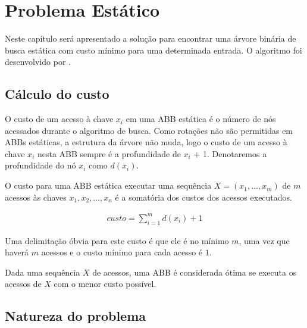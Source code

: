 
\chapter{Problema Estático}
\label{cap:problema-estatico}

Neste capítulo será apresentado a solução para encontrar uma árvore binária de busca estática com custo mínimo para uma determinada entrada. O algoritmo foi desenvolvido por \cite{knuth}.

\section{Cálculo do custo}

O custo de um acesso à chave $x_i$ em uma ABB estática é o número de nós acessados durante o algoritmo de busca. Como rotações não são permitidas em ABBs estáticas, a estrutura da árvore não muda, logo o custo de um acesso à chave $x_i$ nesta ABB sempre é a profundidade de $x_i$ + 1. Denotaremos a profundidade do nó $x_i$ como $d(x_i)$.

O custo para uma ABB estática executar uma sequência $X = (x_{1},\ldots,x_{m})$ de $m$ acessos às chaves $x_{1}, x_{2},\ldots,x_{n}$ é a somatória dos custos dos acessos executados. 

\begin{align*}
    custo = \sum_{i=1}^{m} d(x_i) + 1
\end{align*}

Uma delimitação óbvia para este custo é que ele é no mínimo $m$, uma vez que haverá $m$ acessos e o custo mínimo para cada acesso é $1$.


Dada uma sequência $X$ de acessos, uma ABB é considerada ótima se executa os acessos de $X$ com o menor custo possível.

\section{Natureza do problema}

